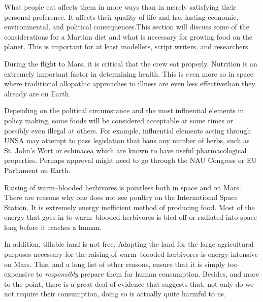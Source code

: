 

What people eat affects them in more ways than in merely satisfying their personal preference. It affects their quality of life and has lasting economic, environmental, and political consequences. This section will discuss some of the considerations for a Martian diet and what is necessary for growing food on the planet. This is important for at least modellers, script writers, and researchers.

During the flight to Mars, it is critical that the crew eat properly. Nutrition is an extremely important factor in determining health. This is even more so in space where traditional allopathic approaches to illness are even less effective than they already are on Earth.

Depending on the political circumstance and the most influential elements in policy making, some foods will be considered acceptable at some times or possibly even illegal at others. For example, influential elements acting through UNSA may attempt to pass legislation that bans any number of herbs, such as St. John’s Wort or echinacea which are known to have useful pharmacological properties. Perhaps approval might need to go through the NAU Congress or EU Parliament on Earth.

Raising of warm--blooded herbivores is pointless both in space and on Mars. There are reasons why one does not see poultry on the International Space Station. It is extremely energy inefficient method of producing food. Most of the energy that goes in to warm--blooded herbivores is bled off or radiated into space long before it reaches a human. 

In addition, tillable land is not free. Adapting the land for the large agricultural purposes necessary for the raising of warm--blooded herbivores is energy intensive on Mars. This, and a long list of other reasons, ensure that it is simply too expensive to {\it responsibly} prepare them for human consumption. Besides, and more to the point, there is a great deal of evidence that suggests that, not only do we not require their consumption, doing so is actually quite harmful to us.

